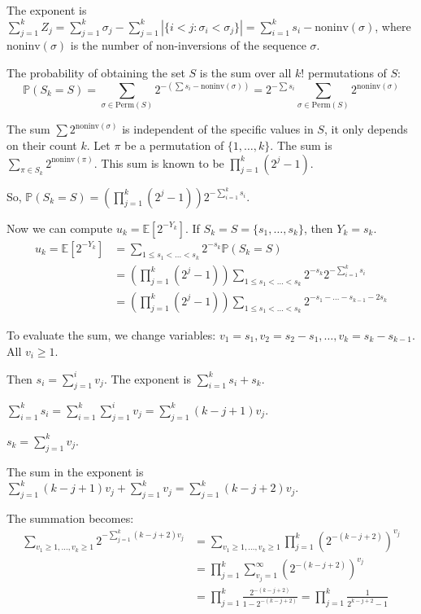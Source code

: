 \documentclass[12pt,a4paper]{article}
\theoremstyle{definition}
\begin{document}
        The exponent is $\sum_{j=1}^k Z_j = \sum_{j=1}^k \sigma_j - \sum_{j=1}^k |\{i<j : \sigma_i < \sigma_j\}| = \sum_{i=1}^k s_i - \text{noninv}(\sigma)$, where $\text{noninv}(\sigma)$ is the number of non-inversions of the sequence $\sigma$.

        The probability of obtaining the set $S$ is the sum over all $k!$ permutations of $S$:
        \[ \mathbb{P}(S_k=S) = \sum_{\sigma \in \text{Perm}(S)} 2^{-(\sum s_i - \text{noninv}(\sigma))} = 2^{-\sum s_i} \sum_{\sigma \in \text{Perm}(S)} 2^{\text{noninv}(\sigma)} \]

        The sum $\sum 2^{\text{noninv}(\sigma)}$ is independent of the specific values in $S$, it only depends on their count $k$. Let $\pi$ be a permutation of $\{1, \dots, k\}$. The sum is $\sum_{\pi \in S_k} 2^{\text{noninv}(\pi)}$. This sum is known to be $\prod_{j=1}^k (2^j-1)$.

        So, $\mathbb{P}(S_k=S) = \left(\prod_{j=1}^k (2^j-1)\right) 2^{-\sum_{i=1}^k s_i}$.

        Now we can compute $u_k = \mathbb{E}[2^{-Y_k}]$. If $S_k=S=\{s_1, \dots, s_k\}$, then $Y_k = s_k$.
        \begin{align}
            u_k = \mathbb{E}[2^{-Y_k}] &= \sum_{1 \leq s_1 < \dots < s_k} 2^{-s_k} \mathbb{P}(S_k=S) \\
            &= \left(\prod_{j=1}^k (2^j-1)\right) \sum_{1 \leq s_1 < \dots < s_k} 2^{-s_k} 2^{-\sum_{i=1}^k s_i} \\
            &= \left(\prod_{j=1}^k (2^j-1)\right) \sum_{1 \leq s_1 < \dots < s_k} 2^{-s_1 - \dots - s_{k-1} - 2s_k}
        \end{align}

        To evaluate the sum, we change variables: $v_1=s_1, v_2=s_2-s_1, \dots, v_k=s_k-s_{k-1}$. All $v_i \geq 1$.

        Then $s_i = \sum_{j=1}^i v_j$. The exponent is $\sum_{i=1}^k s_i + s_k$.

        $\sum_{i=1}^k s_i = \sum_{i=1}^k \sum_{j=1}^i v_j = \sum_{j=1}^k (k-j+1)v_j$.

        $s_k = \sum_{j=1}^k v_j$.

        The sum in the exponent is $\sum_{j=1}^k (k-j+1)v_j + \sum_{j=1}^k v_j = \sum_{j=1}^k (k-j+2)v_j$.

        The summation becomes:
        \begin{align}
            \sum_{v_1 \geq 1, \dots, v_k \geq 1} 2^{-\sum_{j=1}^k (k-j+2)v_j} &= \sum_{v_1 \geq 1, \dots, v_k \geq 1} \prod_{j=1}^k \left(2^{-(k-j+2)}\right)^{v_j} \\
            &= \prod_{j=1}^k \sum_{v_j=1}^{\infty} \left(2^{-(k-j+2)}\right)^{v_j} \\
            &= \prod_{j=1}^k \frac{2^{-(k-j+2)}}{1-2^{-(k-j+2)}} = \prod_{j=1}^k \frac{1}{2^{k-j+2}-1}
        \end{align}
\end{document}
